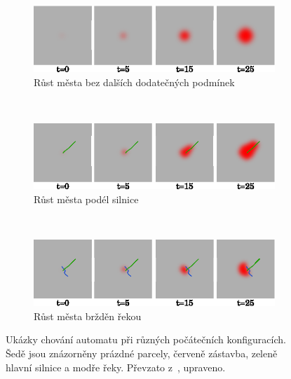 \begin{figure}
    \begin{subfigure}{0.9\textwidth}
      \includegraphics[width=\textwidth]{genimg-urban-growt-transitions-1}
      \caption{Růst města bez dalších dodatečných podmínek} 
    \end{subfigure}
    \\
    \begin{subfigure}{0.9\textwidth}
      \includegraphics[width=\textwidth]{genimg-urban-growt-transitions-2}
      \caption{Růst města podél silnice} 
    \end{subfigure}
    \\
    \begin{subfigure}{0.9\textwidth}
      \includegraphics[width=\textwidth]{genimg-urban-growt-transitions-3}
      \caption{Růst města bržděn řekou} 
    \end{subfigure}

    \caption[Princip automatu pro problém městského růstu]{Ukázky chování automatu při různých počátečních konfiguracích. Šedě jsou znázorněny prázdné parcely, červeně zástavba, zeleně hlavní silnice a modře řeky. Převzato z~\cite{LiuPhi-DevCelAutModUrbGroIncFuzSetApp}, upraveno.} \label{img:VarTransRuls}
\end{figure}

